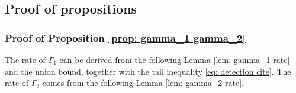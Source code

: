 \documentclass[12pt]{article}
\newcommand{\<}{\langle}
\renewcommand{\>}{\rangle}
\begin{document}
\subsection{Proof of propositions}

\subsubsection{Proof of Proposition \ref{prop: gamma_1 gamma_2}}
The rate of $\Gamma_1$ can be derived from the following Lemma \ref{lem: gamma_1 rate} and the union bound, together with the tail inequality \eqref{eq: detection cite}. The rate of $\Gamma_2$ comes from the following Lemma \ref{lem: gamma_2 rate}. 
\end{document}
